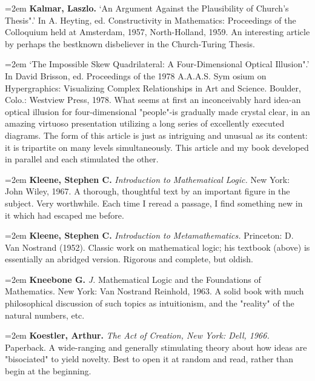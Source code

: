 \par\noindent\hangindent=2em {\bf Kalmar, Laszlo.} `An Argument Against the Plausibility of Church's Thesis".' In A. Heyting, ed. Constructivity in Mathematics: Proceedings of the Colloquium held at Amsterdam, 1957, North-Holland, 1959. An interesting article by perhaps the bestknown disbeliever in the Church-Turing Thesis.

\par\noindent\hangindent=2em  `The Impossible Skew Quadrilateral: A Four-Dimensional Optical Illusion".' In David Brisson, ed. Proceedings of the 1978 A.A.A.S. Sym osium on Hypergraphics: Visualizing Complex Relationships in Art and Science. Boulder, Colo.: Westview Press, 1978. What seems at first an inconceivably hard idea-an optical illusion for four-dimensional "people"-is gradually made crystal clear, in an amazing virtuoso presentation utilizing a long series of excellently executed diagrams. The form of this article is just as intriguing and unusual as its content: it is tripartite on many levels simultaneously. This article and my book developed in parallel and each stimulated the other.

\par\noindent\hangindent=2em {\bf Kleene, Stephen C.} {\it Introduction to Mathematical Logic.} New York: John Wiley, 1967. A thorough, thoughtful text by an important figure in the subject. Very worthwhile. Each time I reread a passage, I find something new in it which had escaped me before.

\par\noindent\hangindent=2em {\bf Kleene, Stephen C.} {\it Introduction to Metamathematics.} Princeton: D. Van Nostrand (1952). Classic work on mathematical logic; his textbook (above) is essentially an abridged version. Rigorous and complete, but oldish.

\par\noindent\hangindent=2em {\bf Kneebone G.} {\it J.} Mathematical Logic and the Foundations of Mathematics. New York: Van Nostrand Reinhold, 1963. A solid book with much philosophical discussion of such topics as intuitionism, and the "reality" of the natural numbers, etc.

\par\noindent\hangindent=2em {\bf Koestler, Arthur.} {\it The Act of Creation, New York: Dell, 1966.} Paperback. A wide-ranging and generally stimulating theory about how ideas are "bisociated" to yield novelty. Best to open it at random and read, rather than begin at the beginning.

